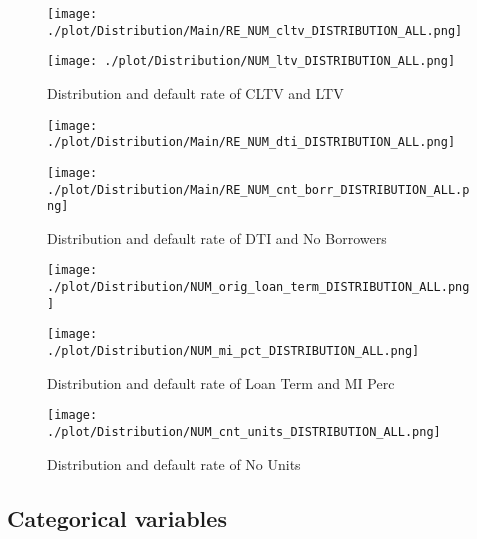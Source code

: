 \begin{figure}[H]
\begin{minipage}{.5\textwidth}
	\centering
	\texttt{[image: ./plot/Distribution/Main/RE\_NUM\_cltv\_DISTRIBUTION\_ALL.png]}
\end{minipage}%
\begin{minipage}{.5\textwidth}
	\centering
	\texttt{[image: ./plot/Distribution/NUM\_ltv\_DISTRIBUTION\_ALL.png]}
\end{minipage}
    \caption{Distribution and default rate of CLTV and LTV}
\end{figure}

\begin{figure}[H]
\begin{minipage}{.5\textwidth}
	\centering
	\texttt{[image: ./plot/Distribution/Main/RE\_NUM\_dti\_DISTRIBUTION\_ALL.png]}
\end{minipage}%
\begin{minipage}{.5\textwidth}
	\centering
	\texttt{[image: ./plot/Distribution/Main/RE\_NUM\_cnt\_borr\_DISTRIBUTION\_ALL.png]}
\end{minipage}
    \caption{Distribution and default rate of DTI and No Borrowers}
\end{figure}

\begin{figure}[H]
\begin{minipage}{.5\textwidth}
	\centering
	\texttt{[image: ./plot/Distribution/NUM\_orig\_loan\_term\_DISTRIBUTION\_ALL.png]}
\end{minipage}%
\begin{minipage}{.5\textwidth}
	\centering
	\texttt{[image: ./plot/Distribution/NUM\_mi\_pct\_DISTRIBUTION\_ALL.png]}
\end{minipage}
    \caption{Distribution and default rate of Loan Term and MI Perc}
\end{figure}

\begin{figure}[H]
	\centering
	\texttt{[image: ./plot/Distribution/NUM\_cnt\_units\_DISTRIBUTION\_ALL.png]}
    \caption{Distribution and default rate of No Units}
\end{figure}

\subsection{Categorical variables}


